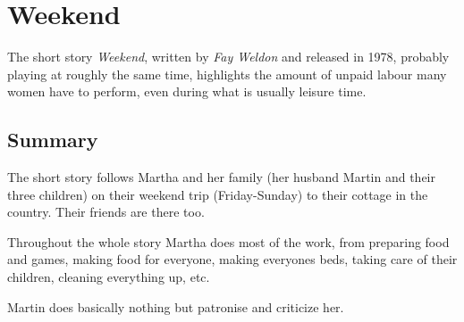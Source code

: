 \documentclass{article}
\begin{document}
\section{Weekend}
The short story \emph{Weekend}, written by \emph{Fay Weldon} and released in 1978, probably playing at roughly the same time, highlights the amount of unpaid labour many women have to perform, even during what is usually leisure time.
 
\subsection{Summary}
The short story follows Martha and her family (her husband Martin and their three children) on their weekend trip (Friday-Sunday) to their cottage in the country. Their friends are there too. 
 
Throughout the whole story Martha does most of the work, from preparing food and games, making food for everyone, making everyones beds, taking care of their children, cleaning everything up, etc.
 
Martin does basically nothing but patronise and criticize her. 
\end{document}
